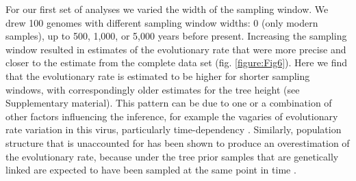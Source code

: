 \documentclass[11pt]{article}
\begin{document}
For our first set of analyses we varied the width of the sampling window. We drew 100 genomes with different sampling window widths: 0 (only modern samples), up to 500, 1,000, or 5,000 years before present. Increasing the sampling window resulted in estimates of the evolutionary rate that were more precise and closer to the estimate from the complete data set (fig. \ref{figure:Fig6}). Here we find that the evolutionary rate is estimated to be higher for shorter sampling windows, with correspondingly older estimates for the tree height (see Supplementary material). This pattern can be due to one or a combination of other factors influencing the inference, for example the vagaries of evolutionary rate variation in this virus, particularly time-dependency \citep{vrancken2017accurate}. Similarly, population structure that is unaccounted for has been shown to produce an overestimation of the evolutionary rate, because under the tree prior samples that are genetically linked are expected to have been sampled at the same point in time \citep{moller2018impact}.
\end{document}
